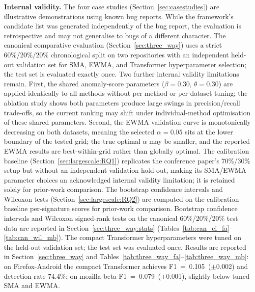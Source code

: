 \documentclass[pdflatex,sn-nature]{sn-jnl}
\theoremstyle{thmstyleone}%
\begin{document}
\textbf{Internal validity.}
The four case studies (Section~\ref{sec:casestudies}) are illustrative
demonstrations using known bug reports.
While the framework's candidate list was generated independently of the
bug report, the evaluation is retrospective and may not generalise to bugs
of a different character.
The canonical comparative evaluation (Section~\ref{sec:three_way})
uses a strict 60\%/20\%/20\% chronological split on two repositories with
an independent held-out validation set for SMA, EWMA, and Transformer
hyperparameter selection; the test set is evaluated exactly once.
Two further internal validity limitations remain.
First, the shared anomaly-score parameters ($\beta=0.30$, $\theta=0.30$)
are applied identically to all methods without per-method or per-dataset
tuning; the ablation study shows both parameters produce large swings in
precision/recall trade-offs, so the current ranking may shift under
individual-method optimisation of these shared parameters.
Second, the EWMA validation curve is monotonically decreasing on both
datasets, meaning the selected $\alpha=0.05$ sits at the lower boundary of
the tested grid; the true optimal $\alpha$ may be smaller, and the
reported EWMA results are best-within-grid rather than globally optimal.
The calibration baseline (Section~\ref{sec:largescale:RQ1}) replicates the
conference paper's 70\%/30\% setup but without an independent validation
hold-out, making its SMA/EWMA parameter choices an acknowledged internal
validity limitation; it is retained solely for prior-work comparison.
The bootstrap confidence intervals and Wilcoxon tests
(Section~\ref{sec:largescale:RQ2}) are computed on the calibration-baseline
per-signature scores for prior-work comparison.
Bootstrap confidence intervals and Wilcoxon signed-rank tests on the
canonical 60\%/20\%/20\% test data are reported in
Section~\ref{sec:three_way:stats}
(Tables~\ref{tab:can_ci_fa}--\ref{tab:can_wil_mb}).
The compact Transformer hyperparameters were tuned on the held-out
validation set; the test set was evaluated once.
Results are reported in Section~\ref{sec:three_way} and
Tables~\ref{tab:three_way_fa}--\ref{tab:three_way_mb}:
on Firefox-Android the compact Transformer achieves F1~=~0.105~($\pm$0.002)
and detection rate 74.4\%; on mozilla-beta F1~=~0.079~($\pm$0.001), slightly
below tuned SMA and EWMA.
\end{document}
